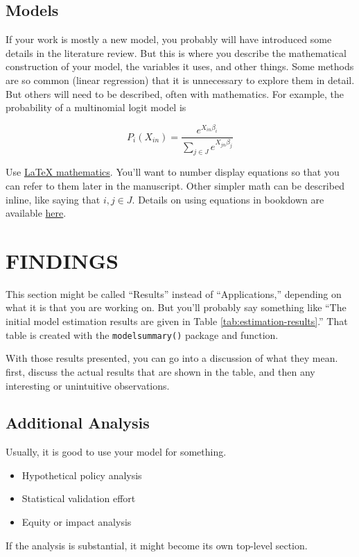 \documentclass[3p, authoryear]{elsarticle} %
\providecommand{\tightlist}{%
  \setlength{\itemsep}{0pt}\setlength{\parskip}{0pt}}
\begin{document}
\hypertarget{models}{%
\subsection{Models}\label{models}}

If your work is mostly a new model, you probably will have introduced some
details in the literature review. But this is where you describe the
mathematical construction of your model, the variables it uses, and other
things. Some methods are so common (linear regression) that it is unnecessary to
explore them in detail. But others will need to be described, often with
mathematics. For example, the probability of a multinomial logit model is

\begin{equation}
  P_i(X_{in}) = \frac{e^{X_{in}\beta_i}}{\sum_{j \in J}e^{X_{jn}\beta_j}}
  \label{eq:mnl}
\end{equation}

Use \href{https://www.overleaf.com/learn/latex/mathematical_expressions}{LaTeX mathematics}.
You'll want to number display equations so that you can
refer to them later in the manuscript. Other simpler math can be described inline,
like saying that \(i, j \in J\). Details on using equations in bookdown are available
\href{https://bookdown.org/yihui/bookdown/markdown-extensions-by-bookdown.html}{here}.

\hypertarget{findings}{%
\section{FINDINGS}\label{findings}}

This section might be called ``Results'' instead of ``Applications,'' depending
on what it is that you are working on. But you'll probably say something like
``The initial model estimation results are given in Table \ref{tab:estimation-results}.''
That table is created with the \texttt{modelsummary()} package and function.

With those results presented, you can go into a discussion of what they mean.
first, discuss the actual results that are shown in the table, and then any
interesting or unintuitive observations.

\hypertarget{additional-analysis}{%
\subsection{Additional Analysis}\label{additional-analysis}}

Usually, it is good to use your model for something.

\begin{itemize}
\tightlist
\item
  Hypothetical policy analysis
\item
  Statistical validation effort
\item
  Equity or impact analysis
\end{itemize}

If the analysis is substantial, it might become its own top-level section.


\end{document}
